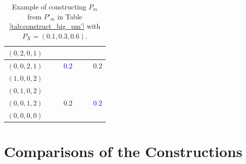\documentclass[11pt,letterpaper]{article}
\begin{document}
\begin{table}[]
\begin{tabular}{c||ccc||ccc}
$(0,2,0,1)$ & \multicolumn{1}{c|}{}                                                & \multicolumn{1}{c|}{}                         &                          & \multicolumn{1}{c|}{}                         & \multicolumn{1}{c|}{\cellcolor{yellow!25}} &                          \\ \hline
$(0,0,2,1)$ & \multicolumn{1}{c|}{}                                                & \multicolumn{1}{c|}{}                         & \textcolor{blue}{$0.2$}                          & \multicolumn{1}{c|}{}                         & \multicolumn{1}{c|}{}                         & \cellcolor{yellow!25}$0.2$ \\ \hline
$(1,0,0,2)$ & \multicolumn{1}{c|}{\cellcolor{yellow!25}}                        & \multicolumn{1}{c|}{}                         &                          & \multicolumn{1}{c|}{}                         & \multicolumn{1}{c|}{}                         &                          \\ \hline
$(0,1,0,2)$ & \multicolumn{1}{c|}{}                                                & \multicolumn{1}{c|}{\cellcolor{yellow!25}} &                          & \multicolumn{1}{c|}{}                         & \multicolumn{1}{c|}{}                         &                          \\ \hline
$(0,0,1,2)$ & \multicolumn{1}{c|}{}                                                & \multicolumn{1}{c|}{}                         & \cellcolor{yellow!25}$0.2$ & \multicolumn{1}{c|}{}                         & \multicolumn{1}{c|}{}                         & \textcolor{blue}{$0.2$}                         \\ \hline
$(0,0,0,0)$ & \multicolumn{1}{c|}{}                                                & \multicolumn{1}{c|}{}                         &                          & \multicolumn{1}{c|}{}                         & \multicolumn{1}{c|}{}                         &                          \\ \hline
\end{tabular}
\caption{Example of constructing $P_m$ from $P'_m$ in Table \ref{tab:construct_big_pm'} with $P_X = (0.1, 0.3, 0.6)$.}
\label{tab:construct_pm_B}
\end{table}

\section{Comparisons of the Constructions}
\end{document}
